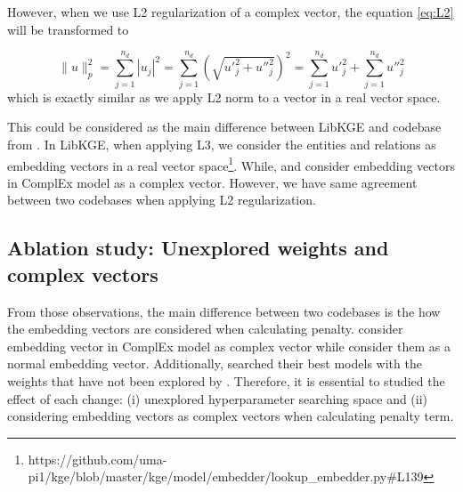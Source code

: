 However, when we use L2 regularization of a complex vector, the equation \ref{eq:L2} will be transformed to  

\begin{equation}
    \label{eq:final L2}
    \|u \|^2_p = \sum_{j=1}^{n_d}|u_j|^2 = \sum_{j=1}^{n_d}\left(\sqrt{{u'}_j^2 + {u''}_j^2}\right)^2 = \sum_{j=1}^{n_d}{u'}_j^2 + \sum_{j=1}^{n_d}{u''}_j^2
\end{equation} which is exactly similar as we apply L2 norm to a vector in a real vector space. 


This could be considered as the main difference between LibKGE and codebase from \citet{chen2021relation}. In LibKGE, when applying L3, we consider the entities and relations as embedding vectors in a real vector space\footnote{https://github.com/uma-pi1/kge/blob/master/kge/model/embedder/lookup\_embedder.py\#L139}. While, \citet{chen2021relation} and \citet{lacroix2018canonical} consider embedding vectors in ComplEx model as a complex vector. However, we have same agreement between two codebases when applying L2 regularization. 
\newline

\subsection[Ablation study]{Ablation study: Unexplored weights and complex vectors}

From those observations, the main difference between two codebases is the how the embedding vectors are considered when calculating penalty. \citet{chen2021relation} consider embedding vector in ComplEx model as complex vector while \citet{libkge} consider them as a normal embedding vector. Additionally, \citet{chen2021relation} searched their best models with the weights that have not been explored by \citet{Ruffinelli2020You}. Therefore, it is essential to studied the effect of each change: (i) unexplored hyperparameter searching space and (ii) considering embedding vectors as complex vectors when calculating penalty term. 

